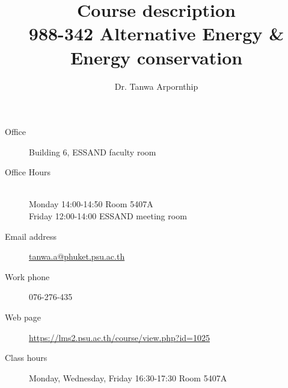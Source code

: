 \documentclass[a4paper,12pt]{article}
\begin{document}

\title{Course description\\ \large 988-342 Alternative Energy \& Energy conservation}
\author{Dr. Tanwa Arpornthip}
\date{}


\maketitle

\noindent\makebox[\linewidth]{\rule{\linewidth}{0.4pt}}
\begin{description}
\item [Office] Building 6, ESSAND faculty room
\item [Office Hours] \hfill \\
    Monday 14:00-14:50 Room 5407A \hfill\\
    Friday 12:00-14:00 ESSAND meeting room
\item [Email address] \href{mailto:tanwa.a@phuket.psu.ac.th}{tanwa.a@phuket.psu.ac.th}
\item [Work phone] 076-276-435
\item [Web page] \href{https://lms2.psu.ac.th/course/view.php?id=1025}{https://lms2.psu.ac.th/course/view.php?id=1025}
\item [Class hours] Monday, Wednesday, Friday 16:30-17:30 Room 5407A
\end{description}
\noindent\makebox[\linewidth]{\rule{\linewidth}{0.4pt}}
\end{document}
